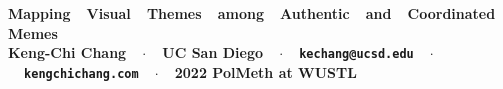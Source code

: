 \documentclass[article,36pt,extrafontsizes,oneside,openany,oldfontcommands]{memoir}
\begin{document}
\begin{topbox}
  \color{titletextcol}
  \vspace{0.8in}
  \bfseries
  \fontsize{100pt}{100pt}\selectfont
  {Mapping~~Visual~~Themes~~among~~Authentic~~and~~Coordinated~~Memes}\\[0.5in]  %
  \color{authortextcol} 
  \mdseries
  \Large{Keng-Chi Chang~~$\cdot$~~UC San Diego~~$\cdot$~~\texttt{kechang@ucsd.edu}~~$\cdot$~~\texttt{kengchichang.com}~~$\cdot$~~2022 PolMeth at WUSTL} 
  \vspace{0.6in}
\end{topbox}




\fontsize{40pt}{45pt}\selectfont
\end{document}
